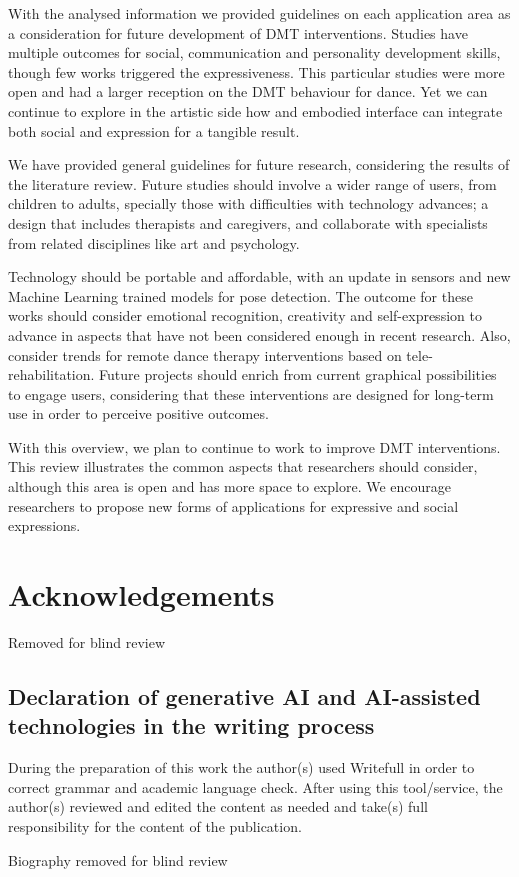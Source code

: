 \documentclass[a4paper,fleqn]{cas-sc}
\begin{document}
With the analysed information we provided guidelines on each application area as a consideration for future development of DMT interventions. 
Studies have multiple outcomes for social, communication and personality development skills, though few works triggered the expressiveness. This particular studies were more open and had a larger reception on the DMT behaviour for dance. Yet we can continue to explore in the artistic side how and embodied interface can integrate both social and expression for a tangible result. 

We have provided general guidelines for future research, considering the results of the literature review. Future studies should involve a wider range of users, from children to adults, specially those with difficulties with technology advances; a design that includes therapists and caregivers, and collaborate with specialists from related disciplines like art and psychology.

Technology should be portable and affordable, with an update in sensors and new Machine Learning trained models for pose detection. The outcome for these works should consider emotional recognition, creativity and self-expression to advance in aspects that have not been considered enough in recent research. Also, consider trends for remote dance therapy interventions based on tele-rehabilitation. Future projects should enrich from current graphical possibilities to engage users, considering that these interventions are designed for long-term use in order to perceive positive outcomes.

With this overview, we plan to continue to work to improve DMT interventions. This review illustrates the common aspects that researchers should consider, although this area is open and has more space to explore. We encourage researchers to propose new forms of applications for expressive and social expressions.


\section*{Acknowledgements}
Removed for blind review

\subsection{Declaration of generative AI and AI-assisted technologies in the writing process}

During the preparation of this work the author(s) used Writefull in order to correct grammar and academic language check. After using this tool/service, the author(s) reviewed and edited the content as needed and take(s) full responsibility for the content of the publication.


\printcredits

%

%



\bio{}
Biography removed for blind review
\endbio
\end{document}
